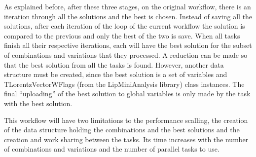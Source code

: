 As explained before, after these three stages, on the original workflow, there is an iteration through all the solutions and the best is chosen. Instead of saving all the solutions, after each iteration of the loop of the current workflow the solution is compared to the previous and only the best of the two is save. When all tasks finish all their respective iterations, each will have the best solution for the subset of combinations and variations that they processed. A reduction can be made so that the best solution from all the tasks is found. However, another data structure must be created, since the best solution is a set of variables and TLorentzVectorWFlags (from the LipMiniAnalysis library) class instances. The final ``uploading'' of the best solution to global variables is only made by the task with the best solution.

This workflow will have two limitations to the performance scalling, the creation of the data structure holding the combinations and the best solutions and the creation and work sharing between the tasks. Its time increases with the number of combinations and variations and the number of parallel tasks to use.